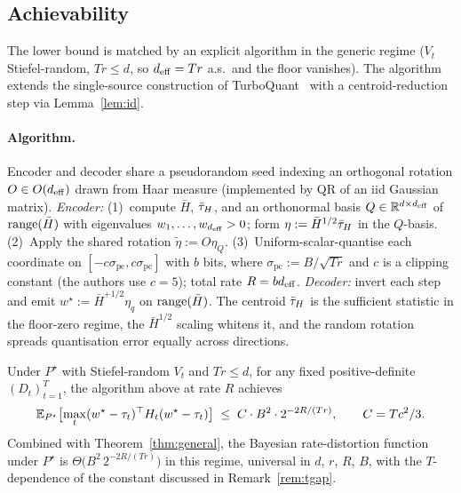 \subsection{Achievability}
\label{app:rd-achv}

The lower bound is matched by an explicit algorithm in the generic
regime ($V_t$ Stiefel-random, $Tr \leq d$, so $d_{\mathrm{eff}} = Tr$ a.s.\ and
the floor vanishes). The algorithm extends the single-source
construction of TurboQuant~\citep{zandieh2025turboquant} with a
centroid-reduction step via Lemma~\ref{lem:id}.

\paragraph{Algorithm.}\label{subsec:alg}\label{subsec:rd-encoder-impl}
Encoder and decoder share a pseudorandom seed indexing an orthogonal
rotation $O \in O(d_{\mathrm{eff}})$ drawn from Haar measure (implemented by QR of
an iid Gaussian matrix). \emph{Encoder:} (1)~compute $\bar H$, $\bar{\tau}_H$,
and an orthonormal basis $Q \in \mathbb{R}^{d\times d_{\mathrm{eff}}}$ of $\operatorname{range}(\bar H)$
with eigenvalues $w_1,\ldots,w_{d_{\mathrm{eff}}} > 0$; form $\eta := \bar
H^{1/2}\bar{\tau}_H$ in the $Q$-basis. (2)~Apply the shared rotation
$\tilde\eta := O\eta_Q$. (3)~Uniform-scalar-quantise each coordinate on
$[-c\sigma_{\mathrm{pc}}, c\sigma_{\mathrm{pc}}]$ with $b$ bits, where
$\sigma_{\mathrm{pc}} := B/\sqrt{Tr}$ and $c$ is a clipping constant
(the authors use $c = 5$); total rate $R = bd_{\mathrm{eff}}$. \emph{Decoder:} invert each
step and emit $w^\star := \bar H^{+1/2}\eta_q$ on $\operatorname{range}(\bar H)$. The
centroid $\bar{\tau}_H$ is the sufficient statistic in the floor-zero regime,
the $\bar H^{1/2}$ scaling whitens it, and the random rotation spreads
quantisation error equally across directions.

\begin{theorem}\label{thm:achv}
Under $P^\star$ with Stiefel-random $V_t$ and $Tr\leq d$, for any fixed
positive-definite $(D_t)_{t=1}^T$, the algorithm above at rate $R$
achieves
\begin{equation}\label{eq:thm-ub}
  \mathbb{E}_{P^\star}\bigl[\max_t(w^\star-\tau_t)^\top H_t(w^\star-
  \tau_t)\bigr]
  \;\leq\; C\cdot B^2 \cdot 2^{-2R/(Tr)},
  \qquad C = Tc^2/3.
\end{equation}
Combined with Theorem~\ref{thm:general}, the Bayesian rate-distortion
function under $P^\star$ is $\Theta\bigl(B^2\, 2^{-2R/(Tr)}\bigr)$ in
this regime, universal in $d$, $r$, $R$, $B$, with the
$T$-dependence of the constant discussed in Remark~\ref{rem:tgap}.
\end{theorem}

